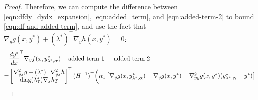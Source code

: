 \begin{proof}
Therefore, we can compute the difference between \cref{eqn:dfdy_dydx_expansion}, \cref{eqn:added_term}, and \cref{eqn:added-term-2} to bound \cref{eqn:df-and-added-term}, and use the fact that $\nabla_y g(x,y^*) + (\lambda^*)^\top \nabla_y h(x,y^*) = 0$: 
\begin{align}
    \footnotesize
    & \frac{d y^*}{d x}^\top \nabla_y 
 f(x,y_{\lambda^*,\boldsymbol{\alpha}}^*) - \text{added term 1 } - \text{added term 2}  \nonumber \\
    = & \begin{bmatrix}
    \nabla^2_{yx} g + (\lambda^*)^\top \nabla_{yx}^2 h \\
        \text{diag}(\lambda^*_\mathcal{I}) \nabla_x h_\mathcal{I}
    \end{bmatrix}^\top (H^{-1})^\top \biggr( \alpha_1 \begin{bmatrix}
        \nabla_y g(x,y_{\lambda^*,\boldsymbol{\alpha}}^*) - \nabla_y g(x,y^*) - \nabla^2_{yy} g(x,y^*) (y_{\lambda^*,\boldsymbol{\alpha}}^* - y^*) \\ 

\end{bmatrix}
\end{align}
\end{proof}
